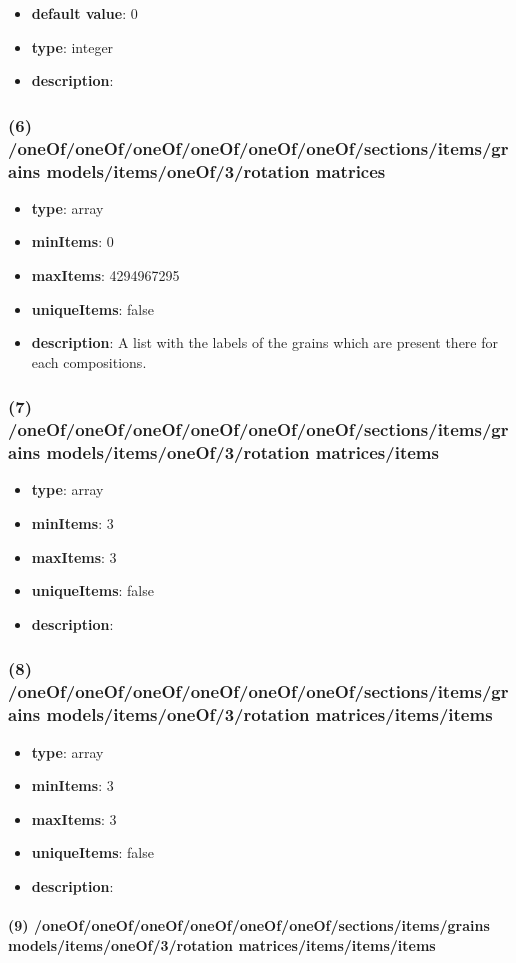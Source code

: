\begin{itemize}[leftmargin=7em]\item {\bf default value}: 0
\item {\bf type}: integer
\item {\bf description}: 
\end{itemize}\subsubsection{(6) /oneOf/oneOf/oneOf/oneOf/oneOf/oneOf/sections/items/grains models/items/oneOf/3/rotation matrices}
\begin{itemize}[leftmargin=6em]\item {\bf type}: array
\item {\bf minItems}: 0
\item {\bf maxItems}: 4294967295
\item {\bf uniqueItems}: false
\item {\bf description}: A list with the labels of the grains which are present there for each compositions.
\end{itemize}\subsubsection{(7) /oneOf/oneOf/oneOf/oneOf/oneOf/oneOf/sections/items/grains models/items/oneOf/3/rotation matrices/items}
\begin{itemize}[leftmargin=7em]\item {\bf type}: array
\item {\bf minItems}: 3
\item {\bf maxItems}: 3
\item {\bf uniqueItems}: false
\item {\bf description}: 
\end{itemize}\subsubsection{(8) /oneOf/oneOf/oneOf/oneOf/oneOf/oneOf/sections/items/grains models/items/oneOf/3/rotation matrices/items/items}
\begin{itemize}[leftmargin=8em]\item {\bf type}: array
\item {\bf minItems}: 3
\item {\bf maxItems}: 3
\item {\bf uniqueItems}: false
\item {\bf description}: 
\end{itemize}\paragraph{(9) /oneOf/oneOf/oneOf/oneOf/oneOf/oneOf/sections/items/grains models/items/oneOf/3/rotation matrices/items/items/items}
